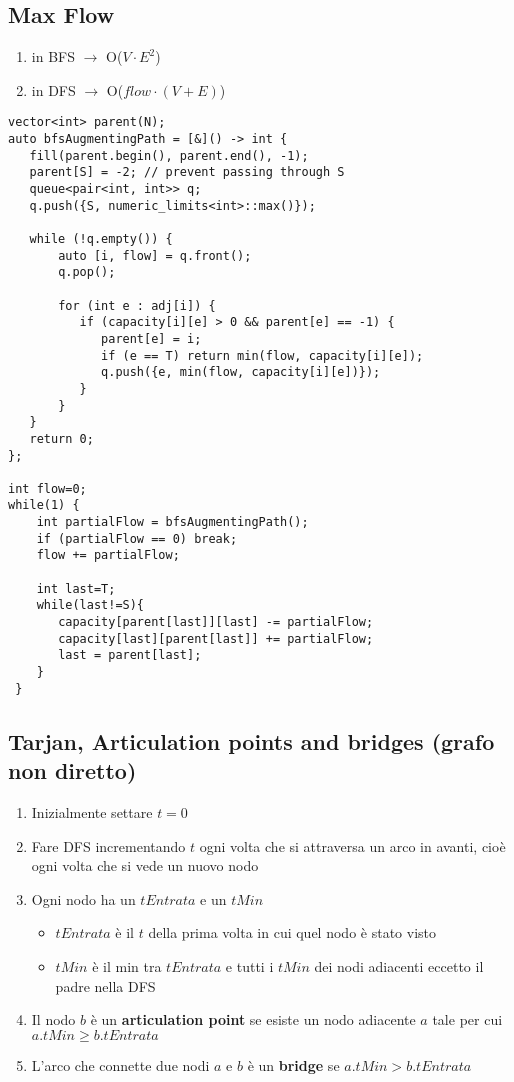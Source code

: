 \subsection{Max Flow}
\begin{enumerate}
    \item in BFS $\rightarrow$ O($V\cdot E^2$)
    \item in DFS $\rightarrow$ O($flow\cdot (V+E)$)
\end{enumerate}
\begin{lstlisting}
vector<int> parent(N);
auto bfsAugmentingPath = [&]() -> int {
   fill(parent.begin(), parent.end(), -1);
   parent[S] = -2; // prevent passing through S
   queue<pair<int, int>> q;
   q.push({S, numeric_limits<int>::max()});

   while (!q.empty()) {
       auto [i, flow] = q.front();
       q.pop();

       for (int e : adj[i]) {
          if (capacity[i][e] > 0 && parent[e] == -1) {
             parent[e] = i;
             if (e == T) return min(flow, capacity[i][e]);
             q.push({e, min(flow, capacity[i][e])});
          }
       }
   }
   return 0;
};

int flow=0;
while(1) {
    int partialFlow = bfsAugmentingPath();
    if (partialFlow == 0) break;
    flow += partialFlow;

    int last=T;
    while(last!=S){
       capacity[parent[last]][last] -= partialFlow;
       capacity[last][parent[last]] += partialFlow;
       last = parent[last];
    }
 }
\end{lstlisting}

\subsection{Tarjan, Articulation points and bridges (grafo non diretto)}
\begin{enumerate}
    \item Inizialmente settare $t=0$
    \item Fare DFS incrementando $t$ ogni volta che si attraversa un arco in avanti, cioè ogni volta che si vede un nuovo nodo
    \item Ogni nodo ha un $tEntrata$ e un $tMin$
    \begin{itemize}
        \item $tEntrata$ è il $t$ della prima volta in cui quel nodo è stato visto
        \item $tMin$ è il min tra $tEntrata$ e tutti i $tMin$ dei nodi adiacenti eccetto il padre nella DFS
    \end{itemize}
    \item Il nodo $b$ è un \textbf{articulation point} se esiste un nodo adiacente $a$ tale per cui $a.tMin \geq b.tEntrata$
    \item L'arco che connette due nodi $a$ e $b$ è un \textbf{bridge} se $a.tMin > b.tEntrata$
\end{enumerate}

